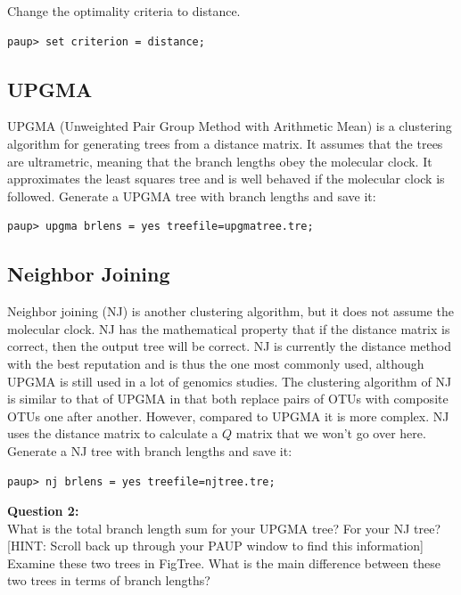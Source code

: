 \documentclass[11pt]{article}
\begin{document}
Change the optimality criteria to distance.
\begin{verbatim}
paup> set criterion = distance;
\end{verbatim}

\subsection{UPGMA}

UPGMA (Unweighted Pair Group Method with Arithmetic Mean) 
is a clustering algorithm for generating trees from a distance matrix. It assumes that the trees are ultrametric, meaning that the branch lengths obey the molecular clock. It approximates the least squares tree and is well behaved if the molecular clock is followed. Generate a UPGMA tree with branch lengths and save it:

\begin{verbatim}
paup> upgma brlens = yes treefile=upgmatree.tre;
\end{verbatim}

\subsection{Neighbor Joining}
Neighbor joining (NJ) is another clustering algorithm, but it does not assume the molecular clock. 
NJ has the mathematical property that if the distance matrix is correct, then the output tree will be correct.
NJ is currently the distance method with the best reputation and is thus the one most commonly used, although UPGMA is still used in a lot of genomics studies. The clustering algorithm of NJ is similar to that of UPGMA in that both replace pairs of OTUs with composite OTUs one after another. 
However, compared to UPGMA it is more complex. NJ uses the distance matrix to calculate
a $Q$ matrix that we won't go over here.
Generate a NJ tree with branch lengths and save it:

\begin{verbatim}
paup> nj brlens = yes treefile=njtree.tre;
\end{verbatim}


\begin{framed}
\noindent
\textbf{Question 2:} \\
What is the total branch length sum for your UPGMA tree? 
For your NJ tree? 
[HINT: Scroll back up through your PAUP window to find this information]
Examine these two trees in FigTree. 
What is the main difference between these two trees in terms of branch lengths?
\end{framed}
\end{document}
